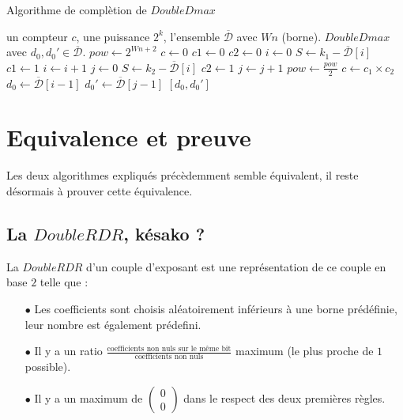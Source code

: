 \documentclass[12pt, a4paper]{memoir}
\newcommand{\doublezero}{\begin{pmatrix} 0 \\ 0 \end{pmatrix}}
\newcommand{\dbarre}{\overline{\mathcal{D}}}
\begin{document}
   \begin{algorithm}
 \caption{Algorithme de complètion de $DoubleDmax$}
 \begin{algorithmic}
  \REQUIRE un compteur $c$, une puissance $2^k$, l'ensemble $\dbarre$ avec $Wn$ (borne).
  \ENSURE $DoubleDmax$ avec $d_0, d_0' \in \dbarre$.
  \STATE $pow \leftarrow 2^{Wn+2}$
  \STATE $c \leftarrow 0$
  \STATE $c1 \leftarrow 0$
  \STATE $c2 \leftarrow 0$
  \STATE $i \leftarrow 0$
  \WHILE{$i < |\dbarre|$ et $c_1 \neq 1$}
  \STATE $S \leftarrow k_1 - \dbarre[i]$
  \STATE $c1 \leftarrow 1$
  \ENDIF
  \STATE $i \leftarrow i+1$
  \ENDWHILE
  \STATE $j \leftarrow 0$
  \WHILE{$j < |\dbarre|$ et $c_2 \neq 1$}
  \STATE $S \leftarrow k_2 - \dbarre[i]$
  \STATE $c2 \leftarrow 1$
  \ENDIF
  \STATE $j \leftarrow j+1$
  \ENDWHILE
  \STATE $pow \leftarrow \frac{pow}{2}$
  \STATE $c \leftarrow c_1 \times c_2$
  \ENDWHILE
  \STATE $d_0 \leftarrow \dbarre[i-1]$
  \STATE $d_0' \leftarrow \dbarre[j-1]$
  \RETURN $[d_0,d_0']$
 \end{algorithmic}
\end{algorithm}
      
  \section{Equivalence et preuve}
  
  Les deux algorithmes expliqués précèdemment semble équivalent, il reste désormais à prouver cette équivalence.

  \subsection{La $DoubleRDR$, késako ?}
  
  \begin{Definition}
   La $DoubleRDR$ d'un couple d'exposant est une représentation de ce couple en base $2$ telle que :
   \begin{itemize}
    \item [$\bullet$] Les coefficients sont choisis aléatoirement inférieurs à une borne prédéfinie, leur 
    nombre est également prédefini.
    \item [$\bullet$] Il y a un ratio $\frac{\text{coefficients non nuls sur le même bit}}{\text{coefficients
    non nuls}}$ maximum (le plus  proche de $1$ possible).
    \item [$\bullet$] Il y a un maximum de $\doublezero$ dans le respect des deux premières règles.
   \end{itemize}
  \end{Definition}
  
\end{document}
